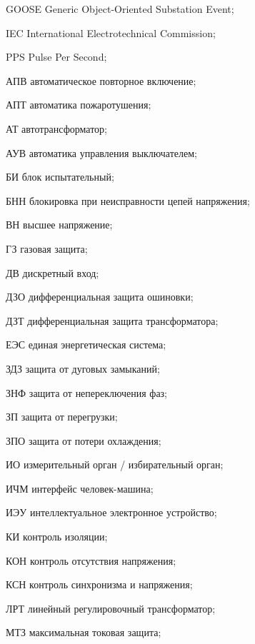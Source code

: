 \begin{list}{}%
{%
  \setlength{\labelwidth}{\abbrwidth}%
  \setlength{\labelsep}{0pt}%
  \setlength{\leftmargin}{\dimexpr\labelwidth+\labelsep\relax}%
  \setlength{\itemindent}{0pt}%
  \setlength{\parsep}{0pt}%
  \setlength{\itemsep}{0pt}
  \renewcommand{\makelabel}[1]{#1 --\hspace{\abbrgap}}%
}
\item[GOOSE] Generic Object-Oriented Substation Event;
\item[IEC]  International Electrotechnical Commission;
\item[PPS] Pulse Per Second;
\item[АПВ] автоматическое повторное включение;
\item[АПТ] автоматика пожаротушения;
\item[АТ] автотрансформатор;
\item[АУВ] автоматика управления выключателем;
\item[БИ] блок испытательный;
\item[БНН] блокировка при неисправности цепей напряжения;
\item[ВН] высшее напряжение;
\item[ГЗ] газовая защита;
\item[ДВ] дискретный вход;
\item[ДЗО] дифференциальная защита ошиновки;
\item[ДЗТ] дифференциальная защита трансформатора;
\item[ЕЭС] единая энергетическая система;
\item[ЗДЗ] защита от дуговых замыканий;
\item[ЗНФ] защита от непереключения фаз;
\item[ЗП] защита от перегрузки;
\item[ЗПО] защита от потери охлаждения;
\item[ИО] измерительный орган / избирательный орган;
\item[ИЧМ] интерфейс человек-машина;
\item[ИЭУ] интеллектуальное электронное устройство;
\item[КИ] контроль изоляции;
\item[КОН] контроль отсутствия напряжения;
\item[КСН] контроль синхронизма и напряжения;
\item[ЛРТ] линейный регулировочный трансформатор;
\item[МТЗ] максимальная токовая защита;

\end{list}
